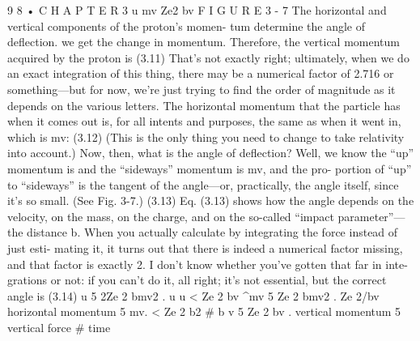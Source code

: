 \documentclass[10pt,oneside]{article}
\begin{document}
9 8 • C H A P T E R  3 u mv Ze2 bv F I G U R E  3 - 7 The horizontal and vertical components of the proton’s momen- tum determine the angle of deflection. we get the change in momentum. Therefore, the vertical momentum acquired by the proton is (3.11) That’s not exactly right; ultimately, when we do an exact integration of this thing, there may be a numerical factor of 2.716 or something---but for now, we’re just trying to find the order of magnitude as it depends on the various letters. The horizontal momentum that the particle has when it comes out is, for all intents and purposes, the same as when it went in, which is mv: (3.12) (This is the only thing you need to change to take relativity into account.) Now, then, what is the angle of deflection? Well, we know the “up” momentum is and the “sideways” momentum is mv, and the pro- portion of “up” to “sideways” is the tangent of the angle---or, practically, the angle itself, since it’s so small. (See Fig. 3-7.) (3.13) Eq. (3.13) shows how the angle depends on the velocity, on the mass, on the charge, and on the so-called “impact parameter”---the distance b. When you actually calculate by integrating the force instead of just esti- mating it, it turns out that there is indeed a numerical factor missing, and that factor is exactly 2. I don’t know whether you’ve gotten that far in inte- grations or not: if you can’t do it, all right; it’s not essential, but the correct angle is (3.14) u 5 2Ze 2 bmv2 . u u < Ze 2 bv \textasciicircum{}mv 5 Ze 2 bmv2 . Ze 2/bv horizontal momentum 5 mv. < Ze 2 b2 \# b v 5 Ze 2 bv . vertical momentum 5 vertical force \# time\par
\end{document}
